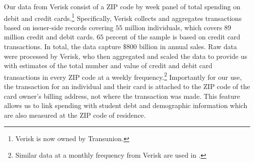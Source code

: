 \documentclass[12pt]{article}
\begin{document}
Our data from Verisk consist of a ZIP code by week panel of total spending on debit and credit cards.\footnote{Verisk is now owned by Transunion.} Specifically, Verisk collects and aggregates  transactions based on issuer-side records covering $55$ million individuals, which covers $89$ million credit and debit cards. $65$ percent of the sample is based on credit card transactions. In total, the data capture $\$800$ billion in annual sales. Raw data were processed by Verisk, who then aggregated and scaled the data to provide us with estimates of the total number and value of credit and debit card transactions in every ZIP code at a weekly frequency.\footnote{Similar data at a monthly frequency from Verisk are used in \cite{mian2023partisan}.}
Importantly for our use, the transaction for an individual and their card is attached to the ZIP code of the card owner's billing address, not where the transaction was made.  This feature allows us to link spending with student debt and demographic information which are also measured at the ZIP code of residence.  

\end{document}
